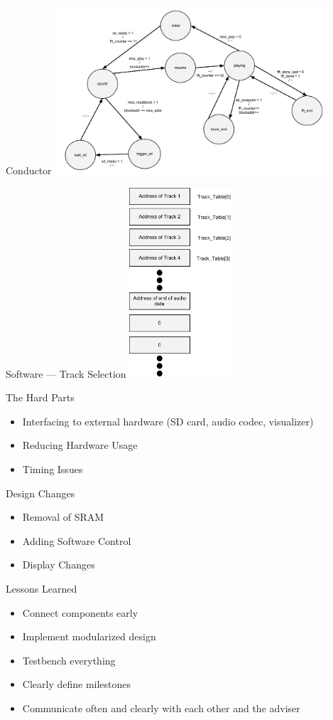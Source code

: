 \documentclass{beamer}
\begin{document}
\begin{frame}{Conductor}
	\centering
    \includegraphics[width=4in]{conductor_state}
\end{frame}

\begin{frame}{Software --- Track Selection}
	\centering
    \includegraphics[width=1.5in]{track_table_diagram}
\end{frame}

\begin{frame}{The Hard Parts}
	\begin{itemize}
		\item Interfacing to external hardware (SD card, audio codec, visualizer) 
		\item Reducing Hardware Usage
		\item Timing Issues
	\end{itemize}
\end{frame}

\begin{frame}{Design Changes}
	\begin{itemize}
		\item Removal of SRAM
		\item Adding Software Control
		\item Display Changes
	\end{itemize}
\end{frame}

\begin{frame}{Lessons Learned}
	\begin{itemize}
		\item Connect components early
		\item Implement modularized design
		\item Testbench everything
		\item Clearly define milestones
		\item Communicate often and clearly with each other and the adviser
	\end{itemize}
\end{frame}
\end{document}
